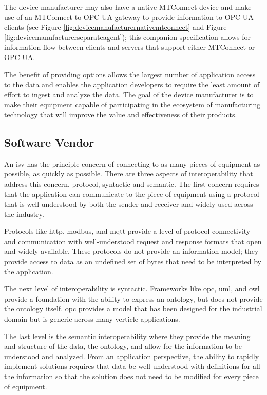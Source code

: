 

The device manufacturer may also have a native MTConnect device and make use of an MTConnect to OPC UA gateway to provide information to OPC UA clients (see Figure \ref{fig:devicemanufacturernativemtconnect} and Figure \ref{fig:devicemanufacturerseparateagent}); this companion specification allows for information flow between clients and servers that support either MTConnect or OPC UA.

The benefit of providing options allows the largest number of application access to the data and enables the application developers to require the least amount of effort to ingest and analyze the data. The goal of the device manufacturer is to make their equipment capable of participating in the ecosystem of manufacturing technology that will improve the value and effectiveness of their products. 



\FloatBarrier

\subsection{Software Vendor}

An \gls{isv} has the principle concern of connecting to as many pieces of equipment as possible, as quickly as possible. There are three aspects of interoperability that address this concern, protocol, syntactic and semantic. The first concern requires that the application can communicate to the piece of equipment using a protocol that is well understood by both the sender and receiver and widely used across the industry. 

Protocols like \gls{http}, \gls{modbus}, and  \gls{mqtt} provide a level of protocol connectivity and communication with well-understood request and response formats that open and widely available. These protocols do not provide an information model; they provide access to data as an undefined set of bytes that need to be interpreted by the application.

The next level of interoperability is syntactic. Frameworks like \gls{opc}, \gls{uml}, and \gls{owl} provide a foundation with the ability to express an \gls{ontology}, but does not provide the \gls{ontology} itself. \gls{opc} provides a model that has been designed for the industrial domain but is generic across many verticle applications. 

The last level is the semantic interoperability where they provide the meaning and structure of the data, the \gls{ontology}, and allow for the information to be understood and analyzed. From an application perspective, the ability to rapidly implement solutions requires that data be well-understood with definitions for all the information so that the solution does not need to be modified for every piece of equipment. 


